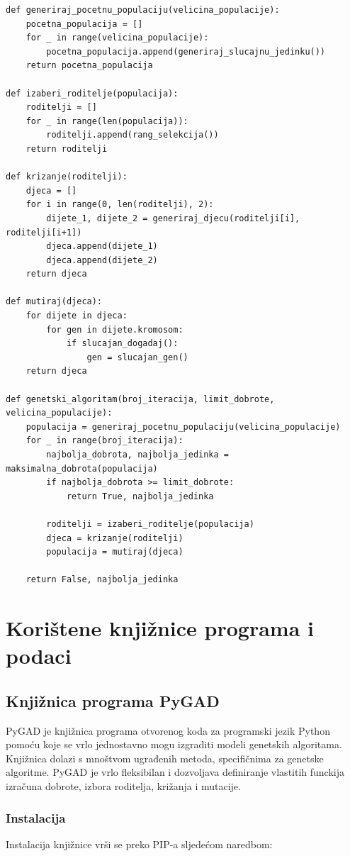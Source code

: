 \documentclass[times, utf8, zavrsni, numeric]{fer}
\begin{document}
\begin{lstlisting}[caption=Genetski algoritam, label={lst:genetski algoritam}]
def generiraj_pocetnu_populaciju(velicina_populacije):
    pocetna_populacija = []
    for _ in range(velicina_populacije):
        pocetna_populacija.append(generiraj_slucajnu_jedinku())
    return pocetna_populacija

def izaberi_roditelje(populacija):
    roditelji = []
    for _ in range(len(populacija)):
        roditelji.append(rang_selekcija())
    return roditelji

def krizanje(roditelji):
    djeca = []
    for i in range(0, len(roditelji), 2):
        dijete_1, dijete_2 = generiraj_djecu(roditelji[i], roditelji[i+1])
        djeca.append(dijete_1)
        djeca.append(dijete_2)
    return djeca

def mutiraj(djeca):
    for dijete in djeca:
        for gen in dijete.kromosom:
            if slucajan_dogadaj():
                gen = slucajan_gen()
    return djeca

def genetski_algoritam(broj_iteracija, limit_dobrote, velicina_populacije):
    populacija = generiraj_pocetnu_populaciju(velicina_populacije)
    for _ in range(broj_iteracija):
        najbolja_dobrota, najbolja_jedinka = maksimalna_dobrota(populacija)
        if najbolja_dobrota >= limit_dobrote:
            return True, najbolja_jedinka
        
        roditelji = izaberi_roditelje(populacija)
        djeca = krizanje(roditelji)
        populacija = mutiraj(djeca)

    return False, najbolja_jedinka
\end{lstlisting}

\chapter{Korištene knjižnice programa i podaci}

\section{Knjižnica programa PyGAD}
PyGAD je knjižnica programa otvorenog koda za programski jezik Python pomoću koje se vrlo jednostavno mogu izgraditi modeli genetskih algoritama. Knjižnica dolazi s mnoštvom ugrađenih metoda, specifičnima za genetske algoritme. PyGAD je vrlo fleksibilan i dozvoljava definiranje vlastitih funckija izračuna dobrote, izbora roditelja, križanja i mutacije.

\subsection{Instalacija}
Instalacija knjižnice vrši se preko PIP-a sljedećom naredbom:
\end{document}
